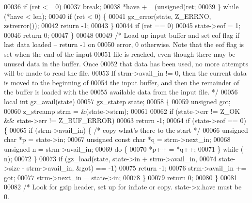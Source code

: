 \begin{DoxyCode}
00036         \textcolor{keywordflow}{if} (ret <= 0)
00037             \textcolor{keywordflow}{break};
00038         *have += (unsigned)ret;
00039     \} \textcolor{keywordflow}{while} (*have < len);
00040     \textcolor{keywordflow}{if} (ret < 0) \{
00041         gz\_error(state, Z\_ERRNO, zstrerror());
00042         \textcolor{keywordflow}{return} -1;
00043     \}
00044     \textcolor{keywordflow}{if} (ret == 0)
00045         state->eof = 1;
00046     \textcolor{keywordflow}{return} 0;
00047 \}
00048 
00049 \textcolor{comment}{/* Load up input buffer and set eof flag if last data loaded -- return -1 on}
00050 \textcolor{comment}{   error, 0 otherwise.  Note that the eof flag is set when the end of the input}
00051 \textcolor{comment}{   file is reached, even though there may be unused data in the buffer.  Once}
00052 \textcolor{comment}{   that data has been used, no more attempts will be made to read the file.}
00053 \textcolor{comment}{   If strm->avail\_in != 0, then the current data is moved to the beginning of}
00054 \textcolor{comment}{   the input buffer, and then the remainder of the buffer is loaded with the}
00055 \textcolor{comment}{   available data from the input file. */}
00056 local \textcolor{keywordtype}{int} gz\_avail(state)
00057     gz\_statep state;
00058 \{
00059     \textcolor{keywordtype}{unsigned} got;
00060     z\_streamp strm = &(state->strm);
00061 
00062     \textcolor{keywordflow}{if} (state->err != Z\_OK && state->err != Z\_BUF\_ERROR)
00063         \textcolor{keywordflow}{return} -1;
00064     \textcolor{keywordflow}{if} (state->eof == 0) \{
00065         \textcolor{keywordflow}{if} (strm->avail\_in) \{       \textcolor{comment}{/* copy what's there to the start */}
00066             \textcolor{keywordtype}{unsigned} \textcolor{keywordtype}{char} *p = state->in;
00067             \textcolor{keywordtype}{unsigned} \textcolor{keyword}{const} \textcolor{keywordtype}{char} *q = strm->next\_in;
00068             \textcolor{keywordtype}{unsigned} n = strm->avail\_in;
00069             \textcolor{keywordflow}{do} \{
00070                 *p++ = *q++;
00071             \} \textcolor{keywordflow}{while} (--n);
00072         \}
00073         \textcolor{keywordflow}{if} (gz\_load(state, state->in + strm->avail\_in,
00074                     state->size - strm->avail\_in, &got) == -1)
00075             \textcolor{keywordflow}{return} -1;
00076         strm->avail\_in += got;
00077         strm->next\_in = state->in;
00078     \}
00079     \textcolor{keywordflow}{return} 0;
00080 \}
00081 
00082 \textcolor{comment}{/* Look for gzip header, set up for inflate or copy.  state->x.have must be 0.}

\end{DoxyCode}
